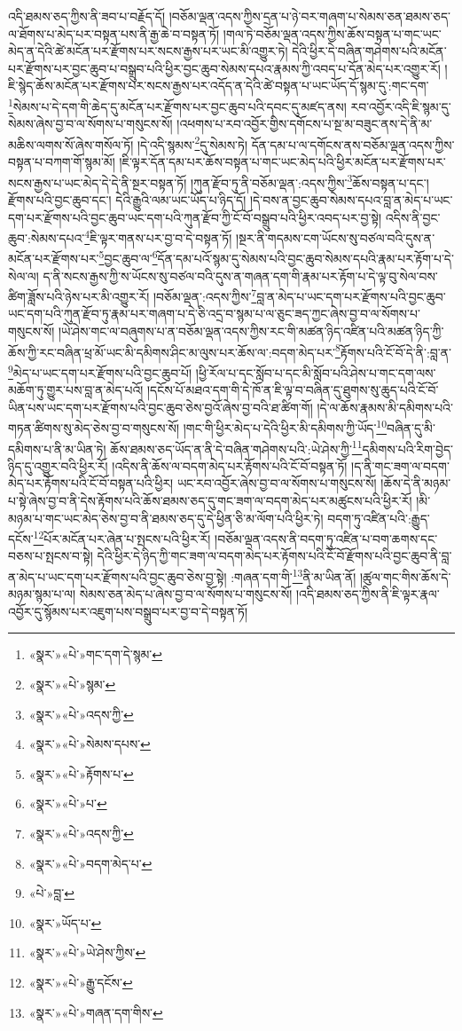 འདི་ཐམས་ཅད་ཀྱིས་ནི་ཟབ་པ་བརྗོད་དོ། །བཅོམ་ལྡན་འདས་ཀྱིས་དྲན་པ་ཉེ་བར་གཞག་པ་སེམས་ཅན་ཐམས་ཅད་ལ་ཐོགས་པ་མེད་པར་བསྟན་པས་ནི་རྒྱ་ཆེ་བ་བསྟན་ཏོ། །གལ་ཏེ་བཅོམ་ལྡན་འདས་ཀྱིས་ཆོས་བསྟན་པ་གང་ཡང་མེད་ན་དེའི་ཚེ་མངོན་པར་རྫོགས་པར་སངས་རྒྱས་པར་ཡང་མི་འགྱུར་ཏེ། དེའི་ཕྱིར་དེ་བཞིན་གཤེགས་པའི་མངོན་པར་རྫོགས་པར་བྱང་ཆུབ་པ་བསྒྲུབ་པའི་ཕྱིར་བྱང་ཆུབ་སེམས་དཔའ་རྣམས་ཀྱི་འབད་པ་དོན་མེད་པར་འགྱུར་རོ། །ཇི་སྙེད་ཆོས་མངོན་པར་རྫོགས་པར་སངས་རྒྱས་པར་འདོད་ན་དེའི་ཚེ་བསྟན་པ་ཡང་ཡོད་དོ་སྙམ་དུ་:གང་དག་\footnote{«སྣར་»«པེ་»གང་དག་དེ་སྙམ་}སེམས་པ་དེ་དག་གི་ཆེད་དུ་མངོན་པར་རྫོགས་པར་བྱང་ཆུབ་པའི་དབང་དུ་མཛད་ནས། རབ་འབྱོར་འདི་ཇི་སྙམ་དུ་སེམས་ཞེས་བྱ་བ་ལ་སོགས་པ་གསུངས་སོ། །འཕགས་པ་རབ་འབྱོར་གྱིས་དགོངས་པ་སྔ་མ་བཟུང་ནས་དེ་ནི་མ་མཆིས་ལགས་སོ་ཞེས་གསོལ་ཏོ། །དེ་འདི་སྙམས་\footnote{«སྣར་»«པེ་»སྙམ་}དུ་སེམས་ཏེ། དོན་དམ་པ་ལ་དགོངས་ནས་བཅོམ་ལྡན་འདས་ཀྱིས་བསྟན་པ་བཀག་གོ་སྙམ་མོ། །ཇི་ལྟར་དོན་དམ་པར་ཆོས་བསྟན་པ་གང་ཡང་མེད་པའི་ཕྱིར་མངོན་པར་རྫོགས་པར་སངས་རྒྱས་པ་ཡང་མེད་དེ་དེ་ནི་སྔར་བསྟན་ཏོ། །ཀུན་རྫོབ་ཏུ་ནི་བཅོམ་ལྡན་:འདས་ཀྱིས་\footnote{«སྣར་»«པེ་»འདས་ཀྱི་}ཆོས་བསྟན་པ་དང་། རྫོགས་པའི་བྱང་ཆུབ་དང་། དེའི་རྒྱུའི་ལམ་ཡང་ཡོད་པ་ཉིད་དོ། །དེ་བས་ན་བྱང་ཆུབ་སེམས་དཔའ་བླ་ན་མེད་པ་ཡང་དག་པར་རྫོགས་པའི་བྱང་ཆུབ་ཡང་དག་པའི་ཀུན་རྫོབ་ཀྱི་ངོ་བོ་བསྒྲུབ་པའི་ཕྱིར་འབད་པར་བྱ་སྟེ། འདིས་ནི་བྱང་ཆུབ་:སེམས་དཔའ་\footnote{«སྣར་»«པེ་»སེམས་དཔས་}ཇི་ལྟར་གནས་པར་བྱ་བ་དེ་བསྟན་ཏོ། །སྔར་ནི་གདམས་ངག་ཡོངས་སུ་བཙལ་བའི་དུས་ན་མངོན་པར་རྫོགས་པར་\footnote{«སྣར་»«པེ་»རྟོགས་པ་}བྱང་ཆུབ་ལ་\footnote{«སྣར་»«པེ་»པ་}དོན་དམ་པའོ་སྙམ་དུ་སེམས་པའི་བྱང་ཆུབ་སེམས་དཔའི་རྣམ་པར་རྟོག་པ་དེ་སེལ་ལ། ད་ནི་སངས་རྒྱས་ཀྱི་ས་ཡོངས་སུ་བཙལ་བའི་དུས་ན་གཞན་དག་གི་རྣམ་པར་རྟོག་པ་དེ་ལྟ་བུ་སེལ་བས་ཚིག་ཟློས་པའི་ཉེས་པར་མི་འགྱུར་རོ། །བཅོམ་ལྡན་:འདས་ཀྱིས་\footnote{«སྣར་»«པེ་»འདས་ཀྱི་}བླ་ན་མེད་པ་ཡང་དག་པར་རྫོགས་པའི་བྱང་ཆུབ་ཡང་དག་པའི་ཀུན་རྫོབ་ཏུ་རྣམ་པར་གཞག་པ་དེ་ཅི་འདྲ་བ་སྙམ་པ་ལ་ཅུང་ཟད་ཀྱང་ཞེས་བྱ་བ་ལ་སོགས་པ་གསུངས་སོ། །ཡེ་ཤེས་གང་ལ་བཞུགས་པ་ན་བཅོམ་ལྡན་འདས་ཀྱིས་རང་གི་མཚན་ཉིད་འཛིན་པའི་མཚན་ཉིད་ཀྱི་ཆོས་ཀྱི་རང་བཞིན་ཕྲ་མོ་ཡང་མི་དམིགས་ཤིང་མ་ལུས་པར་ཆོས་ལ་:བདག་མེད་པར་\footnote{«སྣར་»«པེ་»བདག་མེད་པ་}རྟོགས་པའི་ངོ་བོ་དེ་ནི་:བླ་ན་\footnote{«པེ་»བླ་}མེད་པ་ཡང་དག་པར་རྫོགས་པའི་བྱང་ཆུབ་པོ། །ཕྱི་རོལ་པ་དང་སློབ་པ་དང་མི་སློབ་པའི་ཤེས་པ་གང་དག་ལས་མཆོག་ཏུ་གྱུར་པས་བླ་ན་མེད་པའོ། །དངོས་པོ་མཐའ་དག་གི་དེ་ཁོ་ན་ཇི་ལྟ་བ་བཞིན་དུ་ཐུགས་སུ་ཆུད་པའི་ངོ་བོ་ཡིན་པས་ཡང་དག་པར་རྫོགས་པའི་བྱང་ཆུབ་ཅེས་བྱའོ་ཞེས་བྱ་བའི་ཐ་ཚིག་གོ། །དེ་ལ་ཆོས་རྣམས་མི་དམིགས་པའི་གཏན་ཚིགས་སུ་མེད་ཅེས་བྱ་བ་གསུངས་སོ། །གང་གི་ཕྱིར་མེད་པ་དེའི་ཕྱིར་མི་དམིགས་ཀྱི་ཡོད་\footnote{«སྣར་»ཡོད་པ་}བཞིན་དུ་མི་དམིགས་པ་ནི་མ་ཡིན་ཏེ། ཆོས་ཐམས་ཅད་ཡོད་ན་ནི་དེ་བཞིན་གཤེགས་པའི་:ཡེ་ཤེས་ཀྱི་\footnote{«སྣར་»«པེ་»ཡེ་ཤེས་ཀྱིས་}དམིགས་པའི་རིག་བྱེད་ཉིད་དུ་འགྱུར་བའི་ཕྱིར་རོ། །འདིས་ནི་ཆོས་ལ་བདག་མེད་པར་རྟོགས་པའི་ངོ་བོ་བསྟན་ཏོ། །ད་ནི་གང་ཟག་ལ་བདག་མེད་པར་རྟོགས་པའི་ངོ་བོ་བསྟན་པའི་ཕྱིར། ཡང་རབ་འབྱོར་ཞེས་བྱ་བ་ལ་སོགས་པ་གསུངས་སོ། །ཆོས་དེ་ནི་མཉམ་པ་སྟེ་ཞེས་བྱ་བ་ནི་དེས་རྟོགས་པའི་ཆོས་ཐམས་ཅད་དུ་གང་ཟག་ལ་བདག་མེད་པར་མཚུངས་པའི་ཕྱིར་རོ། །མི་མཉམ་པ་གང་ཡང་མེད་ཅེས་བྱ་བ་ནི་ཐམས་ཅད་དུ་དེ་ཕྱིན་ཅི་མ་ལོག་པའི་ཕྱིར་ཏེ། བདག་ཏུ་འཛིན་པའི་:རྒྱུད་དངོས་\footnote{«སྣར་»«པེ་»རྒྱུ་དངོས་}པོར་མངོན་པར་ཞེན་པ་སྤངས་པའི་ཕྱིར་རོ། །བཅོམ་ལྡན་འདས་ནི་བདག་ཏུ་འཛིན་པ་བག་ཆགས་དང་བཅས་པ་སྤངས་བ་སྟེ། དེའི་ཕྱིར་དེ་ཉིད་ཀྱི་གང་ཟག་ལ་བདག་མེད་པར་རྟོགས་པའི་ངོ་བོ་རྫོགས་པའི་བྱང་ཆུབ་ནི་བླ་ན་མེད་པ་ཡང་དག་པར་རྫོགས་པའི་བྱང་ཆུབ་ཅེས་བྱ་སྟེ། :གཞན་དག་གི་\footnote{«སྣར་»«པེ་»གཞན་དག་གིས་}ནི་མ་ཡིན་ནོ། །ཚུལ་གང་གིས་ཆོས་དེ་མཉམ་སྙམ་པ་ལ། སེམས་ཅན་མེད་པ་ཞེས་བྱ་བ་ལ་སོགས་པ་གསུངས་སོ། །འདི་ཐམས་ཅད་ཀྱིས་ནི་ཇི་ལྟར་རྣལ་འབྱོར་དུ་སྙོམས་པར་འཇུག་པས་བསྒྲུབ་པར་བྱ་བ་དེ་བསྟན་ཏོ། 